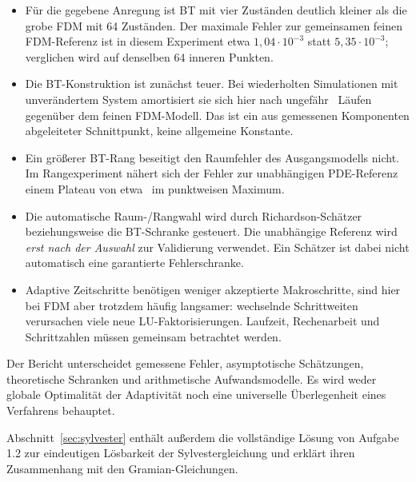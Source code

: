 \documentclass[11pt,a4paper]{article}
\begin{document}
\begin{itemize}
\item Für die gegebene Anregung ist BT mit vier Zuständen deutlich kleiner als die grobe FDM mit 64 Zuständen. Der maximale Fehler zur gemeinsamen feinen FDM-Referenz ist in diesem Experiment etwa $1{,}04\cdot10^{-3}$ statt $5{,}35\cdot10^{-3}$; verglichen wird auf denselben 64 inneren Punkten.
\item Die BT-Konstruktion ist zunächst teuer. Bei wiederholten Simulationen mit unverändertem System amortisiert sie sich hier nach ungefähr \BreakEven\ Läufen gegenüber dem feinen FDM-Modell. Das ist ein aus gemessenen Komponenten abgeleiteter Schnittpunkt, keine allgemeine Konstante.
\item Ein größerer BT-Rang beseitigt den Raumfehler des Ausgangsmodells nicht. Im Rangexperiment nähert sich der Fehler zur unabhängigen PDE-Referenz einem Plateau von etwa \PDEFloor\ im punktweisen Maximum.
\item Die automatische Raum-/Rangwahl wird durch Richardson-Schätzer beziehungsweise die BT-Schranke gesteuert. Die unabhängige Referenz wird \emph{erst nach der Auswahl} zur Validierung verwendet. Ein Schätzer ist dabei nicht automatisch eine garantierte Fehlerschranke.
\item Adaptive Zeitschritte benötigen weniger akzeptierte Makroschritte, sind hier bei FDM aber trotzdem häufig langsamer: wechselnde Schrittweiten verursachen viele neue LU-Faktorisierungen. Laufzeit, Rechenarbeit und Schrittzahlen müssen gemeinsam betrachtet werden.
\end{itemize}

Der Bericht unterscheidet gemessene Fehler, asymptotische Schätzungen, theoretische Schranken und arithmetische Aufwandsmodelle. Es wird weder globale Optimalität der Adaptivität noch eine universelle Überlegenheit eines Verfahrens behauptet.

Abschnitt~\ref{sec:sylvester} enthält außerdem die vollständige Lösung von Aufgabe 1.2 zur eindeutigen Lösbarkeit der Sylvestergleichung und erklärt ihren Zusammenhang mit den Gramian-Gleichungen.
\tableofcontents
\clearpage
{}

\clearpage

\clearpage

\clearpage

\clearpage

\end{document}
